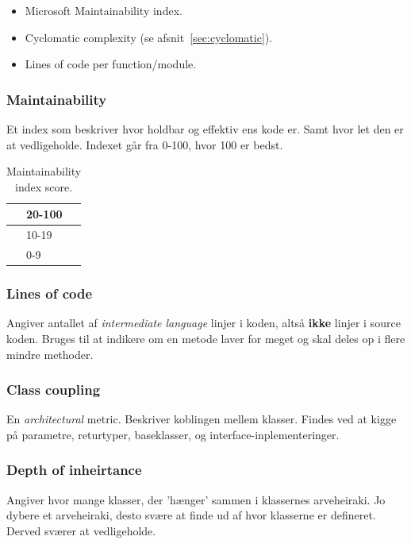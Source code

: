 \begin{itemize}
	\item Microsoft Maintainability index.
	\item Cyclomatic complexity (se afsnit~\ref{sec:cyclomatic}).
	\item Lines of code per function/module.
\end{itemize}

\subsubsection{Maintainability}
Et index som beskriver hvor holdbar og effektiv ens kode er. Samt hvor let den er at vedligeholde. Indexet går fra 0-100, hvor 100 er bedst.

\def\arraystretch{1.5}%
\begin{table}[H]
	\centering
	\begin{tabular}{|c|l|}
		\hline
		\hspace{2cm} \cellcolor{green}& 20-100\\
		\hline
		\cellcolor{yellow}& 10-19\\
		\hline
		\cellcolor{red}& 0-9\\
		\hline
	\end{tabular}
	\caption{Maintainability index score.}
\end{table}

\subsubsection{Lines of code}
Angiver antallet af \textit{intermediate language} linjer i koden, altså \textbf{ikke} linjer i source koden. Bruges til at indikere om en metode laver for meget og skal deles op i flere mindre methoder.

\subsubsection{Class coupling}
En \textit{architectural} metric. Beskriver koblingen mellem klasser. Findes ved at kigge på parametre, returtyper, baseklasser, og interface-inplementeringer.

\subsubsection{Depth of inheirtance}
Angiver hvor mange klasser, der 'hænger' sammen i klassernes arveheiraki. Jo dybere et arveheiraki, desto svære at finde ud af hvor klasserne er defineret. Derved sværer at vedligeholde.







